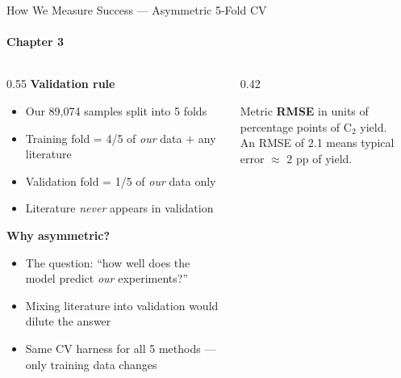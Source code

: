 \documentclass[aspectratio=169,12pt]{beamer}
\begin{document}
\begin{frame}{How We Measure Success — Asymmetric 5-Fold CV}
  \framesubtitle{Chapter 3}

  \begin{columns}[T]

    \begin{column}{0.55\textwidth}
      \vspace{4pt}
      \textbf{Validation rule}
      \begin{itemize}
        \item Our 89,074 samples split into 5 folds
        \item Training fold = 4/5 of \emph{our} data $+$ any literature
        \item \alert{Validation fold = 1/5 of \emph{our} data only}
        \item Literature \emph{never} appears in validation
      \end{itemize}

      \vspace{6pt}
      \textbf{Why asymmetric?}
      \begin{itemize}
        \item The question: ``how well does the model predict
          \emph{our} experiments?''
        \item Mixing literature into validation would dilute the answer
        \item Same CV harness for all 5 methods — only training data changes
      \end{itemize}
    \end{column}

    \begin{column}{0.42\textwidth}
      \begin{block}{Metric}
        \textbf{RMSE} in units of percentage points of C$_2$ yield.\\[4pt]
        \footnotesize An RMSE of 2.1 means typical error $\approx$ 2 pp of yield.
      \end{block}

      \vspace{6pt}
    \end{column}

  \end{columns}

\end{frame}
\end{document}
